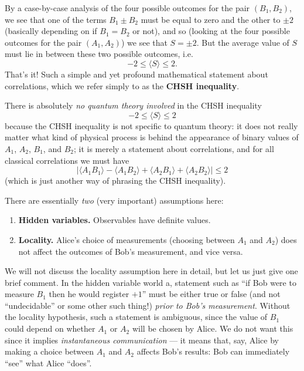 \documentclass[fleqn]{article}
\providecommand{\tightlist}{%
  \setlength{\itemsep}{0pt}\setlength{\parskip}{0pt}}
\newenvironment{idea}{\noindent}{\medskip}
\begin{document}
By a case-by-case analysis of the four possible outcomes for the pair \((B_1,B_2)\), we see that one of the terms \(B_1\pm B_2\) must be equal to zero and the other to \(\pm 2\) (basically depending on if \(B_1=B_2\) or not), and so (looking at the four possible outcomes for the pair \((A_1,A_2)\)) we see that \(S=\pm2\).
But the average value of \(S\) must lie in between these two possible outcomes, i.e.
\[
  -2 \leqslant\langle S\rangle \leqslant 2.
\]
That's it!
Such a simple and yet profound mathematical statement about correlations, which we refer simply to as the \textbf{CHSH inequality}.

\begin{idea}
There is absolutely \emph{no quantum theory involved} in the CHSH inequality
\[
  -2 \leqslant\langle S\rangle \leqslant 2
\]
because the CHSH inequality is not specific to quantum theory: it does not really matter what kind of physical process is behind the appearance of binary values of \(A_1\), \(A_2\), \(B_1\), and \(B_2\); it is merely a statement about correlations, and for all classical correlations we must have
\[
  |
    \langle A_1 B_1\rangle - \langle A_1 B_2\rangle + \langle A_2 B_1\rangle + \langle A_2 B_2\rangle
  | \leqslant 2
\]
(which is just another way of phrasing the CHSH inequality).

\end{idea}

There are essentially \emph{two} (very important) assumptions here:

\begin{enumerate}
\def\labelenumi{\arabic{enumi}.}
\tightlist
\item
  \textbf{Hidden variables.} Observables have definite values.
\item
  \textbf{Locality.} Alice's choice of measurements (choosing between \(A_1\) and \(A_2\)) does not affect the outcomes of Bob's measurement, and vice versa.
\end{enumerate}

We will not discuss the locality assumption here in detail, but let us just give one brief comment.
In the hidden variable world a, statement such as ``if Bob were to measure \(B_1\) then he would register \(+1\)'' must be either true or false (and not ``undecidable'' or some other such thing!) \emph{prior to Bob's measurement}.
Without the locality hypothesis, such a statement is ambiguous, since the value of \(B_1\) could depend on whether \(A_1\) or \(A_2\) will be chosen by Alice.
We do not want this since it implies \emph{instantaneous communication} --- it means that, say, Alice by making a choice between \(A_1\) and \(A_2\) affects Bob's results: Bob can immediately ``see'' what Alice ``does''.
\end{document}
